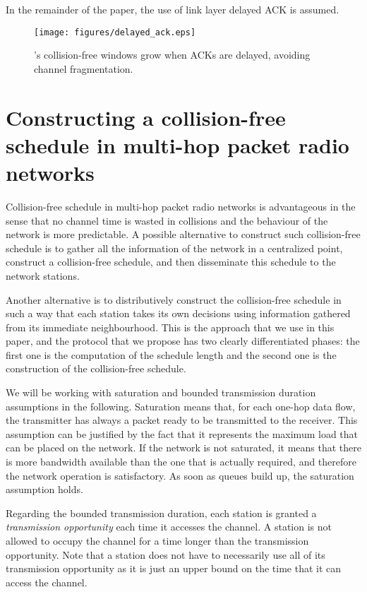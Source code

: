\documentclass[twocolumn]{svjour3}          \smartqed  \usepackage{graphicx}
\begin{document}
In the remainder of the paper, the use of link layer delayed ACK is assumed.



\begin{figure*}
\centering
  \texttt{[image: figures/delayed\_ack.eps]}
\caption{'s collision-free windows grow when ACKs are delayed, avoiding channel fragmentation.}
\label{fig:delayed_ack}
\end{figure*}



\section{Constructing a collision-free schedule in multi-hop packet radio networks}
\label{sec:protocol}

Collision-free schedule in multi-hop packet radio networks is advantageous in the sense that no channel time is wasted in collisions and the behaviour of the network is more predictable.
A possible alternative to construct such collision-free schedule is to gather all the information of the network in a centralized point, construct a collision-free schedule, and then disseminate this schedule to the network stations.


Another alternative is to distributively construct the collision-free schedule in such a way that each station takes its own decisions using information gathered from its immediate neighbourhood.
This is the approach that we use in this paper, and the protocol that we propose has two clearly differentiated phases: the first one is the computation of the schedule length and the second one is the construction of the collision-free schedule.

We will be working with saturation and bounded transmission duration assumptions in the following.
Saturation means that, for each one-hop data flow, the transmitter has always a packet ready to be transmitted to the receiver.
This assumption can be justified by the fact that it represents the maximum load that can be placed on the network.
If the network is not saturated, it means that there is more bandwidth available than the one that is actually required, and therefore the network operation is satisfactory.
As soon as queues build up, the saturation assumption holds.

Regarding the bounded transmission duration, each station is granted a \emph{transmission opportunity} each time it accesses the channel.
A station is not allowed to occupy the channel for a time longer than the transmission opportunity.
Note that a station does not have to necessarily use all of its transmission opportunity as it is just an upper bound on the time that it can access the channel.
\end{document}
